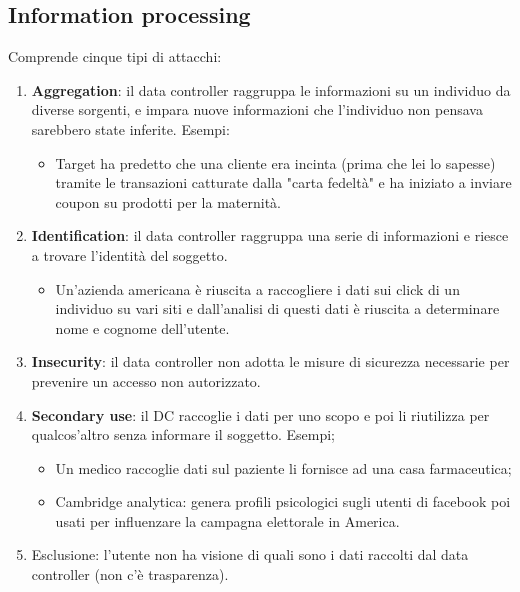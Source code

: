 \subsection{Information processing}
Comprende cinque tipi di attacchi:
\begin{enumerate}
    \item \textbf{Aggregation}: il data controller raggruppa le informazioni su un individuo da diverse sorgenti, e impara nuove informazioni che l’individuo non pensava sarebbero state inferite. Esempi:
    \begin{itemize}
        \item Target ha predetto che una cliente era incinta (prima che lei lo sapesse) tramite le transazioni catturate dalla "carta fedeltà" e ha iniziato a inviare coupon su prodotti per la maternità.
    \end{itemize}
    \item \textbf{Identification}: il data controller raggruppa una serie di informazioni e riesce a trovare l’identità del soggetto.
    \begin{itemize}
        \item Un'azienda americana è riuscita a raccogliere i dati sui click di un individuo su vari siti e dall'analisi di questi dati è riuscita a determinare nome e cognome dell'utente.
    \end{itemize}
    \item \textbf{Insecurity}: il data controller non adotta le misure di sicurezza necessarie per prevenire un accesso non autorizzato.
    \item \textbf{Secondary use}: il DC raccoglie i dati per uno scopo e poi li riutilizza per qualcos'altro senza informare il soggetto. Esempi;
    \begin{itemize}
        \item Un medico raccoglie dati sul paziente li fornisce ad una casa farmaceutica;
        \item Cambridge analytica: genera profili psicologici sugli utenti di facebook poi usati per influenzare la campagna elettorale in America.
    \end{itemize}
    \item Esclusione: l’utente non ha visione di quali sono i dati raccolti dal data controller (non c'è trasparenza).
\end{enumerate}

